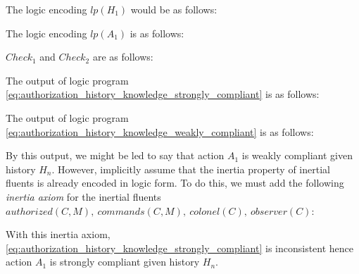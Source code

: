 The logic encoding $lp(H_1)$ would be as follows\footnotemark:



The logic encoding $lp(A_1)$ is as follows:


$Check_1$ and $Check_2$ are as follows:



The output of logic program \cref{eq:authorization_history_knowledge_strongly_compliant} is as follows:


The output of logic program \cref{eq:authorization_history_knowledge_weakly_compliant} is as follows:


By this output, we might be led to say that action $A_1$ is weakly compliant given history $H_n$.
However, \citet{gelfond_authorization_2008} implicitly assume that the inertia property of inertial fluents is already encoded in logic form.
To do this, we must add the following \textit{inertia axiom} for the inertial fluents $authorized(C,M),\ commands(C,M),\ colonel(C),\ observer(C)$:


With this inertia axiom, \cref{eq:authorization_history_knowledge_strongly_compliant} is inconsistent hence action $A_1$ is strongly compliant given history $H_n$.



